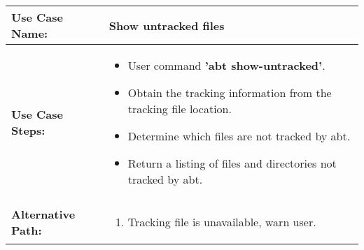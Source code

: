 \medskip

\begin{tabularx}{\linewidth}{|l|X|}
\hline
\textbf{Use Case Name:} & \textbf{Show untracked files} \\
\hline
\textbf{Use Case Steps:} & 
\begin{minipage}{\linewidth} 
  \vspace{0.05em}
  \begin{itemize}
    \item User command \textbf{'abt show-untracked'}.
    \item Obtain the tracking information from the tracking file location.
    \item Determine which files are not tracked by abt.
    \item Return a listing of files and directories not tracked by abt.
    \end{itemize}
  \vspace{0.05em}
\end{minipage}
\\
\hline 
\textbf{Alternative Path:} &
\begin{minipage}{\linewidth}
  \vspace{0.05em} 
  \begin{enumerate}
    \item Tracking file is unavailable, warn user.
  \end{enumerate}
  \vspace{0.05em} 
\end{minipage}
\\
\hline
\end{tabularx}